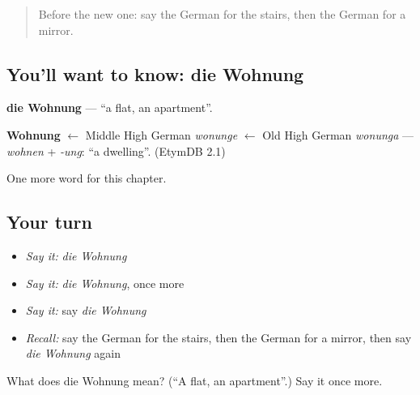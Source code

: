 \label{lesson:GE-C78-wohnung}



\begin{quote}
Before the new one: say the German for the stairs, then the German for a mirror.
\end{quote}

\subsection*{You'll want to know: die Wohnung}
\textbf{die Wohnung} — \textquotedblleft{}a flat, an apartment\textquotedblright{}.

\begin{cousinweb}
\textbf{Wohnung} $\leftarrow$ Middle High German \emph{wonunge} $\leftarrow$ Old High German \emph{wonunga} — \emph{wohnen} + \emph{-ung}: \textquotedblleft{}a dwelling\textquotedblright{}. (EtymDB 2.1)
\end{cousinweb}

\begin{grammarlens}[title={What you've built}]
One more word for this chapter.
\end{grammarlens}

\subsection*{Your turn}
\begin{itemize}
\raggedright
  \item \emph{Say it:} \emph{die Wohnung}
  \item \emph{Say it:} \emph{die Wohnung}, once more
  \item \emph{Say it:} say \emph{die Wohnung}
  \item \emph{Recall:} say the German for the stairs, then the German for a mirror, then say \emph{die Wohnung} again
\end{itemize}

\begin{tcolorbox}[breakable,colback=teal!4,colframe=teal!35!black,title={Before you move on}]
What does die Wohnung mean? (\textquotedblleft{}A flat, an apartment\textquotedblright{}.) Say it once more.
\end{tcolorbox}
